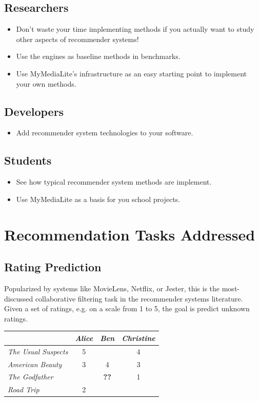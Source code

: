 \documentclass[a4paper, foldmark, 12pt]{leaflet}
\newcommand{\UserI}{\textit{Alice}}
\newcommand{\UserII}{\textit{Ben}}
\newcommand{\UserIII}{\textit{Christine}}
\newcommand{\MovieI}{\textit{The Usual Suspects}}
\newcommand{\MovieII}{\textit{American Beauty}}
\newcommand{\MovieIII}{\textit{The Godfather}}
\newcommand{\MovieIV}{\textit{Road Trip}}
\begin{document}
\subsection{Researchers}
\begin{itemize}
	\item Don't waste your time implementing methods
	      if you actually want to study
	      other aspects of recommender systems!
	\item Use the engines as baseline methods in benchmarks.
	\item Use MyMediaLite's infrastructure as an easy
	      starting point to implement your own methods.
\end{itemize}

\subsection{Developers}
\begin{itemize}
	\item Add recommender system technologies to your software.
\end{itemize}

\subsection{Students}
\begin{itemize}
	\item See how typical recommender system methods are implement.
	\item Use MyMediaLite as a basis for you school projects.
\end{itemize}

\newpage

\section{Recommendation Tasks Addressed}

\subsection{Rating Prediction}

Popularized by systems like MovieLens, Netflix, or Jester,
this is the most-discussed collaborative filtering task in the
recommender systems literature.
Given a set of ratings, e.g. on a scale from 1 to 5,
the goal is predict unknown ratings.

\begin{center}
      \begin{tabular}{|l||c|c|c|}
        \hline
	           & \UserI & \UserII & \UserIII \\ \hline
	\hline
	\MovieI    &  5   &     & 4     \\ \hline
	\MovieII   &  3   & 4   & 3    \\ \hline
	\MovieIII  &      & \textbf{??}    & 1    \\ \hline
	\MovieIV   &  2   &     &        \\ \hline
      \end{tabular}
\end{center}
\end{document}
